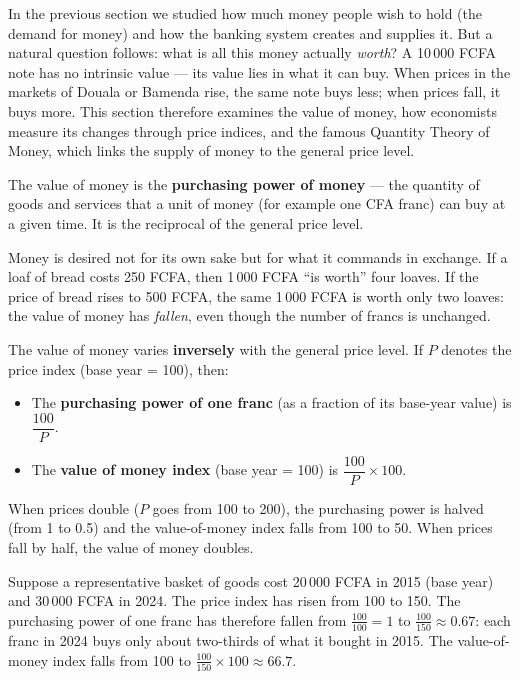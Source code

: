 \documentclass[11pt]{article}
\newcommand{\cle}[1]{{\popxbold\color{popdark}#1}}
\newcounter{popsec}
\newcounter{popsub}
\newcommand{\courssub}[1]{%
  \stepcounter{popsub}%
  \par\vspace{9pt}\noindent{\popxbold\fontsize{11.5}{13}\selectfont\color{popink}{\color{poporange}\thepopsec.\thepopsub}\hspace{6pt}#1}\par\nopagebreak\vspace{4pt}
}
\begin{document}
In the previous section we studied how much money people wish to hold (the demand for money) and how the banking system creates and supplies it. But a natural question follows: what is all this money actually \emph{worth}? A 10\,000 FCFA note has no intrinsic value --- its value lies in what it can buy. When prices in the markets of Douala or Bamenda rise, the same note buys less; when prices fall, it buys more. This section therefore examines the \cle{value of money}, how economists measure its changes through \cle{price indices}, and the famous \cle{Quantity Theory of Money}, which links the supply of money to the general price level.

\courssub{The Meaning of the Value of Money}

\begin{definition}
The \cle{value of money} is the \textbf{purchasing power of money} --- the quantity of goods and services that a unit of money (for example one CFA franc) can buy at a given time. It is the reciprocal of the general price level.
\end{definition}

Money is desired not for its own sake but for what it commands in exchange. If a loaf of bread costs 250 FCFA, then 1\,000 FCFA ``is worth'' four loaves. If the price of bread rises to 500 FCFA, the same 1\,000 FCFA is worth only two loaves: the value of money has \emph{fallen}, even though the number of francs is unchanged.

\begin{propriete}
The value of money varies \textbf{inversely} with the general price level. If $P$ denotes the price index (base year = 100), then:
\begin{itemize}
\item The \textbf{purchasing power of one franc} (as a fraction of its base-year value) is $\dfrac{100}{P}$.
\item The \textbf{value of money index} (base year = 100) is $\dfrac{100}{P}\times 100$.
\end{itemize}
When prices double ($P$ goes from 100 to 200), the purchasing power is halved (from 1 to 0.5) and the value-of-money index falls from 100 to 50. When prices fall by half, the value of money doubles.
\end{propriete}

\begin{exemplebox}
Suppose a representative basket of goods cost 20\,000 FCFA in 2015 (base year) and 30\,000 FCFA in 2024. The price index has risen from 100 to 150. The purchasing power of one franc has therefore fallen from $\frac{100}{100}=1$ to $\frac{100}{150}\approx 0.67$: each franc in 2024 buys only about two-thirds of what it bought in 2015. The value-of-money index falls from 100 to $\frac{100}{150}\times 100 \approx 66.7$.
\end{exemplebox}
\end{document}

